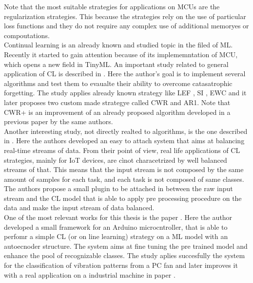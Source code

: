 \documentclass[12pt]{report}
\begin{document}
Note that the most suitable strategies for applications on MCUs are the regularization strategies. This because the strategies rely on the use of particular loss functions and they do not require any complex use of additional memoryes or compoutations. \\
Continual learning is an already known and studied topic in the filed of ML. Recently it started to gain attention because of its implememntation of MCU, which opens a new field in TinyML. An important study related to general application of CL is described in \autocite{}. Here the author's goal is to implement several algorithms and test them to evaualte their ability to overcome catasatrophic forgetting. The study applies already known strategy like LEF \autocite{}, SI \autocite{}, EWC \autocite{} and it later proposes two custom made strategye called CWR and AR1. Note that CWR+ is an improvement of an already proposed algorithm developed in a previous paper by the same authors. \\
Another interesting study, not directly realted to algorithms, is the one described in \autocite{}. Here the authors developed an easy to attach system that aims at balancing real-time streams of data. From their point of view, real life applications of CL strategies, mainly for IoT devices, are cìnot characetrized by well balanced streams of that. This means that the input stream is not composed by the same amount of samples for each task, and each task is not composed of same classes. The authors propose a small plugin to be attached in between the raw input stream and the CL model that is able to apply pre processing procedure on the data and make the input stream of data balanced. \\
One of the most relevant works for this thesis is the paper \autocite{}. Here the author developed a small framework for an Arduino microcntroller, that is able to perfomr a simple CL (or on line learning) strategy on a ML model with an autoecnoder structure. The system aims at fine tuning the pre trained model and enhance the pool of recognizable classes. The study aplies succesfully the system for the classification of vibration patterns from a PC fan and later improves it with a real application on a industrial machine in paper \autocite{}. 
\end{document}
